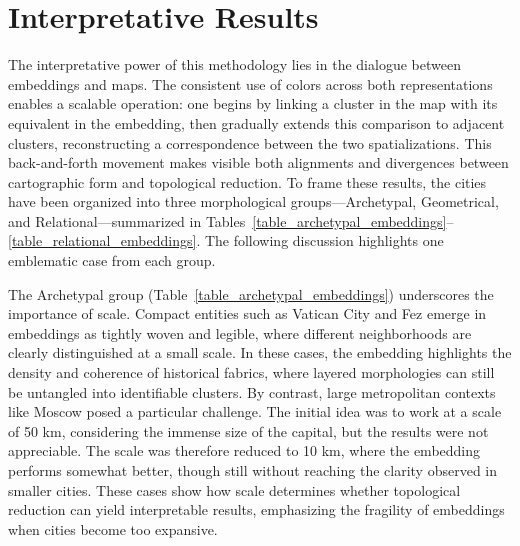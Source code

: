 \documentclass[land,article,accept,pdftex,oneauthor]{Definitions/mdpi}
\begin{document}
{%

\section{Interpretative Results}\label{sec4}

The interpretative power of this methodology lies in the dialogue between embeddings and maps. The consistent use of colors across both representations enables a scalable operation: one begins by linking a cluster in the map with its equivalent in the embedding, then gradually extends this comparison to adjacent clusters, reconstructing a correspondence between the two spatializations. This back-and-forth movement makes visible both alignments and divergences between cartographic form and topological reduction. To frame these results, the cities have been organized into three morphological groups---{Archetypal}, {Geometrical}, and {Relational}---summarized in Tables~\ref{table_archetypal_embeddings}--\ref{table_relational_embeddings}. The following discussion highlights one emblematic case from each group.


The {Archetypal} group (Table~\ref{table_archetypal_embeddings}) underscores the importance of scale. Compact entities such as Vatican City and Fez emerge in embeddings as tightly woven and legible, where different neighborhoods are clearly distinguished at a small scale. In these cases, the embedding highlights the density and coherence of historical fabrics, where layered morphologies can still be untangled into identifiable clusters. By contrast, large metropolitan contexts like Moscow posed a particular challenge. The initial idea was to work at a scale of 50 km, considering the immense size of the capital, but the results were not appreciable. The scale was therefore reduced to 10 km, where the embedding performs somewhat better, though still without reaching the clarity observed in smaller cities. These cases show how scale determines whether topological reduction can yield interpretable results, emphasizing the fragility of embeddings when cities become too expansive.

}
\end{document}
